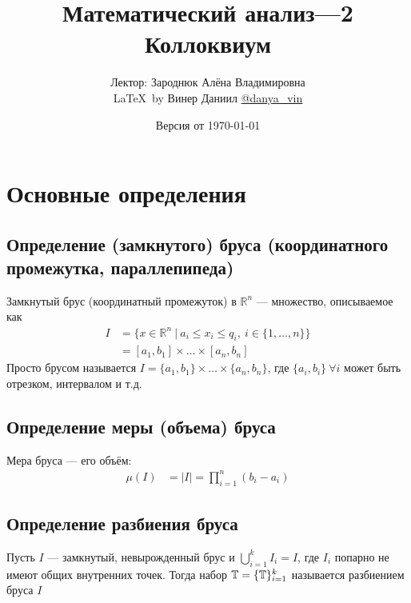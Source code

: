 \documentclass[a4paper]{article}
\begin{document}
\title{\LARGE{Математический анализ—2}\\ Коллоквиум}
\author{Лектор: Зароднюк Алёна Владимировна\\\LaTeX\ by Винер Даниил \href{https://t.me/danya_vin}{@danya\_vin}}
\date{Версия от \today}
\maketitle

\tableofcontents
\newpage
\setlength{\parindent}{15pt}
\setlength{\parskip}{2mm}
\section{Основные определения}
\subsection{Определение (замкнутого) бруса (координатного промежутка, параллепипеда)}
 Замкнутый брус (координатный промежуток) в $\mathbb{R}^n$ — множество, описываемое как
\begin{equation*}
\begin{aligned}
    I&=\{x\in\mathbb{R}^n\ |\ a_i\leqslant x_i\leqslant q_i,\ i\in\{1,\ldots,n\}\}\\
    &=\left[a_1,b_1\right]\times\ldots\times\left[a_n,b_n\right]
\end{aligned}
\end{equation*}
\comment Просто брусом называется $I=\{a_1,b_1\}\times\ldots\times\{a_n,b_n\}$, где $\{a_i,b_i\}\ \forall i$ может быть отрезком, интервалом и т.д.

\subsection{Определение меры (объема) бруса}
 Мера бруса — его объём:
\begin{equation*}
    \begin{aligned}
        \mu(I)&=|I|
        =\prod_{i=1}^{n} (b_i-a_i)
    \end{aligned}
\end{equation*}


\subsection{Определение разбиения бруса}
 Пусть $I$ — замкнутый, невырожденный брус и $\displaystyle\bigcup_{i=1}^kI_i = I$, где $I_i$ попарно не имеют общих внутренних точек. Тогда набор $\operatorname{\mathbb{T}} = \{\operatorname{\mathbb{T}}\}_{i=1}^k$ называется разбиением бруса $I$
\end{document}
